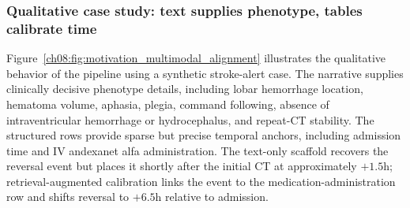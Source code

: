 \subsubsection{Qualitative case study: text supplies phenotype, tables calibrate time}
\label{ch08:sec:vignette_results}


Figure~\ref{ch08:fig:motivation_multimodal_alignment} illustrates the qualitative behavior of the pipeline using a synthetic stroke-alert case.
The narrative supplies clinically decisive phenotype details, including lobar hemorrhage location, hematoma volume, aphasia, plegia, command following, absence of intraventricular hemorrhage or hydrocephalus, and repeat-CT stability.
The structured rows provide sparse but precise temporal anchors, including admission time and IV andexanet alfa administration.
The text-only scaffold recovers the reversal event but places it shortly after the initial CT at approximately \(+1.5\)h; retrieval-augmented calibration links the event to the medication-administration row and shifts reversal to \(+6.5\)h relative to admission.


